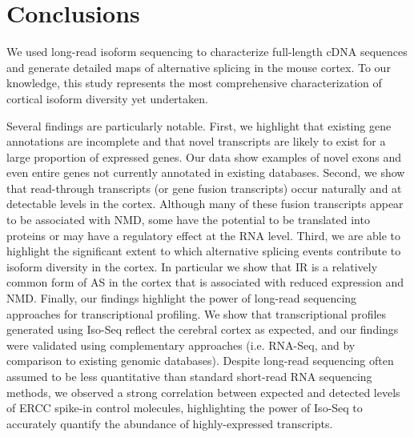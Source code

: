 \newpage
\section{Conclusions}
We used long-read isoform sequencing to characterize full-length cDNA sequences and generate detailed maps of alternative splicing in the mouse cortex. To our knowledge, this study represents the most comprehensive characterization of cortical isoform diversity yet undertaken. 

Several findings are particularly notable. First, we highlight that existing gene annotations are incomplete and that novel transcripts are likely to exist for a large proportion of expressed genes. Our data show examples of novel exons and even entire genes not currently annotated in existing databases. Second, we show that read-through transcripts (or gene fusion transcripts) occur naturally\cite{Mehani2020} and at detectable levels in the cortex. Although many of these fusion transcripts appear to be associated with NMD, some have the potential to be translated into proteins or may have a regulatory effect at the RNA level. Third, we are able to highlight the significant extent to which alternative splicing events contribute to isoform diversity in the cortex. In particular we show that IR is a relatively common form of AS in the cortex that is associated with reduced expression and NMD. Finally, our findings highlight the power of long-read sequencing approaches for transcriptional profiling. We show that transcriptional profiles generated using Iso-Seq reflect the cerebral cortex as expected, and our findings were validated using complementary approaches (i.e. RNA-Seq, and by comparison to existing genomic databases). Despite long-read sequencing often assumed to be less quantitative than standard short-read RNA sequencing methods\cite{Zhao2019}, we observed a strong correlation between expected and detected levels of ERCC spike-in control molecules, highlighting the power of Iso-Seq to accurately quantify the abundance of highly-expressed transcripts.

